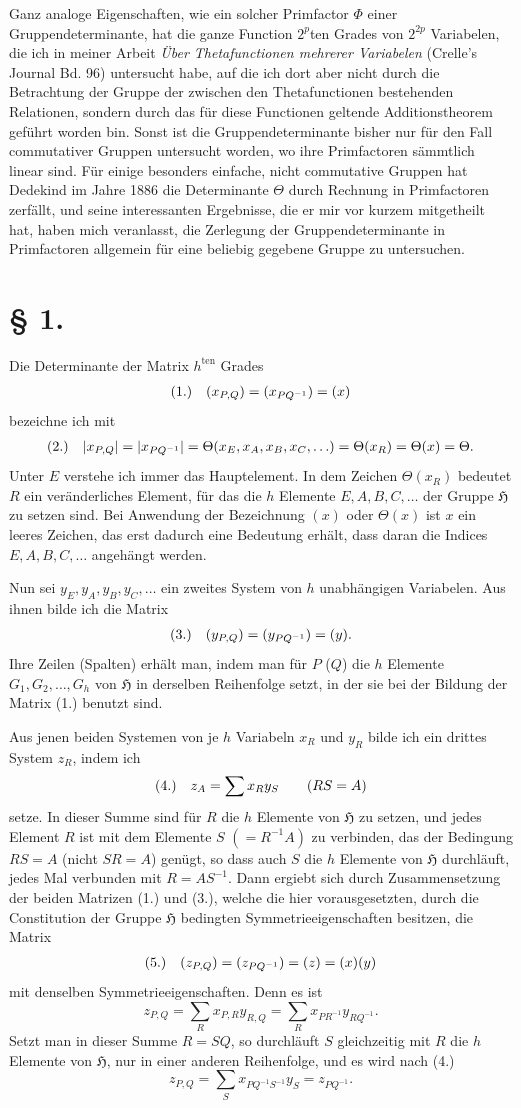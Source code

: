 \documentclass[11pt]{article}
\makeatletter
\newcommand{\Hgrp}{\mathfrak{H}}
\newcommand{\frobtagc}[2]{\[\begin{array}{@{}r@{\quad}c@{}}\textup{(#1)} & \displaystyle #2\end{array}\]}
\makeatother
\begin{document}
Ganz analoge Eigenschaften, wie ein solcher Primfactor $\Phi$ einer Gruppendeterminante, hat die ganze Function $2^p$ten Grades von $2^{2p}$ Variabelen, die ich in meiner Arbeit \emph{Über Thetafunctionen mehrerer Variabelen} (Crelle's Journal Bd. 96) untersucht habe, auf die ich dort aber nicht durch die Betrachtung der Gruppe der zwischen den Thetafunctionen bestehenden Relationen, sondern durch das für diese Functionen geltende Additionstheorem geführt worden bin. Sonst ist die Gruppendeterminante bisher nur für den Fall commutativer Gruppen untersucht worden, wo ihre Primfactoren sämmtlich linear sind. Für einige besonders einfache, nicht commutative Gruppen hat Dedekind im Jahre 1886 die Determinante $\Theta$ durch Rechnung in Primfactoren zerfällt, und seine interessanten Ergebnisse, die er mir vor kurzem mitgetheilt hat, haben mich veranlasst, die Zerlegung der Gruppendeterminante in Primfactoren allgemein für eine beliebig gegebene Gruppe zu untersuchen.

\section*{§ 1.}

Die Determinante der Matrix $h^{\mathrm{ten}}$ Grades
\frobtagc{1.}{(x_{P,Q})=(x_{PQ^{-1}})=(x)}
bezeichne ich mit
\frobtagc{2.}{|x_{P,Q}|=|x_{PQ^{-1}}|=\Theta(x_E,x_A,x_B,x_C,\ldots)=\Theta(x_R)=\Theta(x)=\Theta.}
Unter $E$ verstehe ich immer das Hauptelement. In dem Zeichen $\Theta(x_R)$ bedeutet $R$ ein veränderliches Element, für das die $h$ Elemente $E,A,B,C,\ldots$ der Gruppe $\Hgrp$ zu setzen sind. Bei Anwendung der Bezeichnung $(x)$ oder $\Theta(x)$ ist $x$ ein leeres Zeichen, das erst dadurch eine Bedeutung erhält, dass daran die Indices $E,A,B,C,\ldots$ angehängt werden.

Nun sei $y_E,y_A,y_B,y_C,\ldots$ ein zweites System von $h$ unabhängigen Variabelen. Aus ihnen bilde ich die Matrix
\frobtagc{3.}{(y_{P,Q})=(y_{PQ^{-1}})=(y).}
Ihre Zeilen (Spalten) erhält man, indem man für $P$ ($Q$) die $h$ Elemente $G_1,G_2,\ldots,G_h$ von $\Hgrp$ in derselben Reihenfolge setzt, in der sie bei der Bildung der Matrix (1.) benutzt sind.

Aus jenen beiden Systemen von je $h$ Variabeln $x_R$ und $y_R$ bilde ich ein drittes System $z_R$, indem ich
\frobtagc{4.}{z_A=\sum x_Ry_S\qquad (RS=A)}
setze. In dieser Summe sind für $R$ die $h$ Elemente von $\Hgrp$ zu setzen, und jedes Element $R$ ist mit dem Elemente $S$ $(=R^{-1}A)$ zu verbinden, das der Bedingung $RS=A$ (nicht $SR=A$) genügt, so dass auch $S$ die $h$ Elemente von $\Hgrp$ durchläuft, jedes Mal verbunden mit $R=AS^{-1}$. Dann ergiebt sich durch Zusammensetzung der beiden Matrizen (1.) und (3.), welche die hier vorausgesetzten, durch die Constitution der Gruppe $\Hgrp$ bedingten Symmetrieeigenschaften besitzen, die Matrix
\frobtagc{5.}{(z_{P,Q})=(z_{PQ^{-1}})=(z)=(x)(y)}
mit denselben Symmetrieeigenschaften. Denn es ist
\[
z_{P,Q}=\sum_R x_{P,R}y_{R,Q}=\sum_R x_{PR^{-1}}y_{RQ^{-1}}.
\]
Setzt man in dieser Summe $R=SQ$, so durchläuft $S$ gleichzeitig mit $R$ die $h$ Elemente von $\Hgrp$, nur in einer anderen Reihenfolge, und es wird nach (4.)
\[
z_{P,Q}=\sum_S x_{PQ^{-1}S^{-1}}y_S=z_{PQ^{-1}}.
\]
\end{document}
